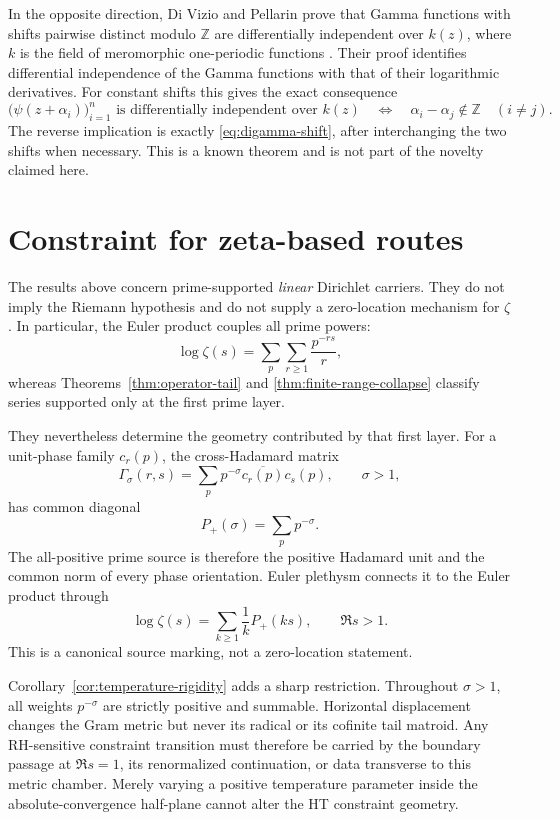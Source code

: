 \documentclass[11pt]{article}
\theoremstyle{definition}
\theoremstyle{remark}
\newcommand{\Z}{\mathbb Z}
\begin{document}
In the opposite direction, Di Vizio and Pellarin prove that Gamma functions with shifts
pairwise distinct modulo \(\Z\) are differentially independent over
\(k(z)\), where \(k\) is the field of meromorphic one-periodic functions
\cite[Theorem~6.1]{DiVizioPellarin2026}.  Their proof identifies differential independence of
the Gamma functions with that of their logarithmic derivatives.  For constant shifts this gives
the exact consequence
\[
  \bigl(\psi(z+\alpha_i)\bigr)_{i=1}^n
  \text{ is differentially independent over }k(z)
  \quad\Longleftrightarrow\quad
  \alpha_i-\alpha_j\notin\Z\quad(i\neq j).
\]
The reverse implication is exactly \eqref{eq:digamma-shift}, after interchanging the two shifts
when necessary.  This is a known theorem and is not part of the novelty claimed here.

\section{Constraint for zeta-based routes}

The results above concern prime-supported \emph{linear} Dirichlet carriers.  They do not imply
the Riemann hypothesis and do not supply a zero-location mechanism for \(\zeta\).  In
particular, the Euler product couples all prime powers:
\[
  \log\zeta(s)=\sum_p\sum_{r\geq1}\frac{p^{-rs}}r,
\]
whereas Theorems~\ref{thm:operator-tail} and
\ref{thm:finite-range-collapse} classify series supported only at the first prime layer.

They nevertheless determine the geometry contributed by that first layer.  For a unit-phase
family \(c_r(p)\), the cross-Hadamard matrix
\[
  \Gamma_\sigma(r,s)
  =\sum_p p^{-\sigma}\overline{c_r(p)}c_s(p),
  \qquad \sigma>1,
\]
has common diagonal
\[
  P_+(\sigma)=\sum_pp^{-\sigma}.
\]
The all-positive prime source is therefore the positive Hadamard unit and the common norm of
every phase orientation.  Euler plethysm connects it to the Euler product through
\[
  \log\zeta(s)=\sum_{k\geq1}\frac1k P_+(ks),
  \qquad \Re s>1.
\]
This is a canonical source marking, not a zero-location statement.

Corollary~\ref{cor:temperature-rigidity} adds a sharp restriction.  Throughout
\(\sigma>1\), all weights \(p^{-\sigma}\) are strictly positive and summable.  Horizontal
displacement changes the Gram metric but never its radical or its cofinite tail matroid.  Any
RH-sensitive constraint transition must therefore be carried by the boundary passage at
\(\Re s=1\), its renormalized continuation, or data transverse to this metric chamber.  Merely
varying a positive temperature parameter inside the absolute-convergence half-plane cannot alter
the HT constraint geometry.
\end{document}
